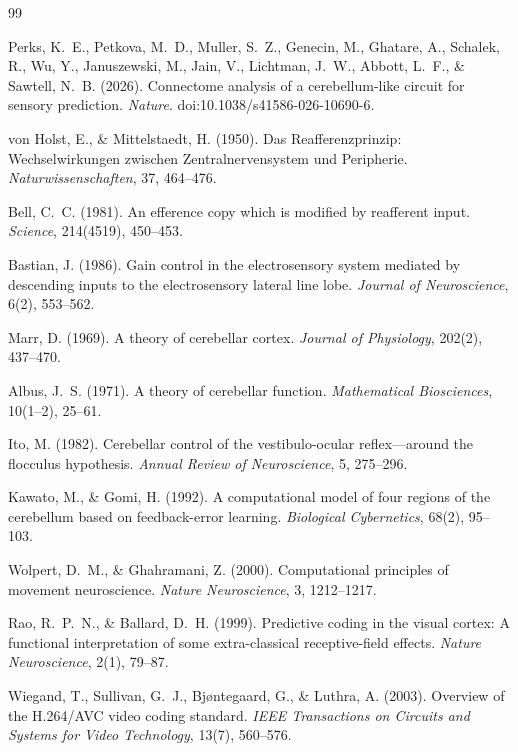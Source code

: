 \documentclass[12pt,a4paper]{article}
\begin{document}
\begin{thebibliography}{99}

Perks, K.~E., Petkova, M.~D., Muller, S.~Z., Genecin, M., Ghatare, A., Schalek, R., Wu, Y., Januszewski, M., Jain, V., Lichtman, J.~W., Abbott, L.~F., \& Sawtell, N.~B. (2026).
Connectome analysis of a cerebellum-like circuit for sensory prediction.
\emph{Nature}. doi:10.1038/s41586-026-10690-6.

von Holst, E., \& Mittelstaedt, H. (1950).
Das Reafferenzprinzip: Wechselwirkungen zwischen Zentralnervensystem und Peripherie.
\emph{Naturwissenschaften}, 37, 464--476.

Bell, C.~C. (1981).
An efference copy which is modified by reafferent input.
\emph{Science}, 214(4519), 450--453.

Bastian, J. (1986).
Gain control in the electrosensory system mediated by descending inputs to the electrosensory lateral line lobe.
\emph{Journal of Neuroscience}, 6(2), 553--562.

Marr, D. (1969).
A theory of cerebellar cortex.
\emph{Journal of Physiology}, 202(2), 437--470.

Albus, J.~S. (1971).
A theory of cerebellar function.
\emph{Mathematical Biosciences}, 10(1--2), 25--61.

Ito, M. (1982).
Cerebellar control of the vestibulo-ocular reflex---around the flocculus hypothesis.
\emph{Annual Review of Neuroscience}, 5, 275--296.

Kawato, M., \& Gomi, H. (1992).
A computational model of four regions of the cerebellum based on feedback-error learning.
\emph{Biological Cybernetics}, 68(2), 95--103.

Wolpert, D.~M., \& Ghahramani, Z. (2000).
Computational principles of movement neuroscience.
\emph{Nature Neuroscience}, 3, 1212--1217.

Rao, R.~P.~N., \& Ballard, D.~H. (1999).
Predictive coding in the visual cortex: A functional interpretation of some extra-classical receptive-field effects.
\emph{Nature Neuroscience}, 2(1), 79--87.

Wiegand, T., Sullivan, G.~J., Bj{\o}ntegaard, G., \& Luthra, A. (2003).
Overview of the H.264/AVC video coding standard.
\emph{IEEE Transactions on Circuits and Systems for Video Technology}, 13(7), 560--576.


\end{thebibliography}
\end{document}
